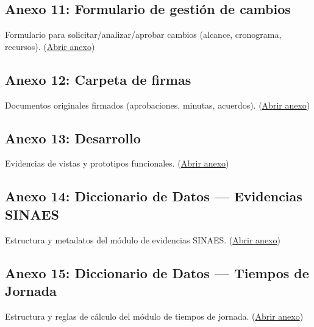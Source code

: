 \subsection*{Anexo 11: Formulario de gestión de cambios}
\label{anexo:formulario_gestion_de_cambios}
\parbox{\linewidth}{%
Formulario para solicitar/analizar/aprobar cambios (alcance, cronograma, recursos).
(\href{https://drive.google.com/file/d/1LlylabUQ4ncxDJ_cMAvHNNz0IbQ720eB/view?usp=sharing}{Abrir anexo})
}

\subsection*{Anexo 12: Carpeta de firmas}
\label{anexo:carpeta_firmas}
\parbox{\linewidth}{%
Documentos originales firmados (aprobaciones, minutas, acuerdos).
(\href{https://drive.google.com/drive/folders/1RyhaHzP8_-uZjUJkA3g5nfkAvk997w2Y?usp=sharing}{Abrir anexo})
}

\subsection*{Anexo 13: Desarrollo}
\label{anexo:desarrollo}
\parbox{\linewidth}{%
Evidencias de vistas y prototipos funcionales.
(\href{https://drive.google.com/drive/folders/1Gh8xDngg0TndL0D7ia3ZEBqxs9TuCOrf?usp=sharing}{Abrir anexo})
}

\subsection*{Anexo 14: Diccionario de Datos — Evidencias SINAES}
\label{anexo:dicc_evidencias}
\parbox{\linewidth}{%
Estructura y metadatos del módulo de evidencias SINAES.
(\href{https://drive.google.com/file/d/1aWdZiAq-vZ_1Ty9TgkDgT_mCuPRHtm_o/view?usp=drive_link}{Abrir anexo})
}

\subsection*{Anexo 15: Diccionario de Datos — Tiempos de Jornada}
\label{anexo:dicc_jornada}
\parbox{\linewidth}{%
Estructura y reglas de cálculo del módulo de tiempos de jornada.
(\href{https://drive.google.com/file/d/1hmq_H_os67XBwliWEogt59qXKPFq964F/view?usp=drive_link}{Abrir anexo})
}

